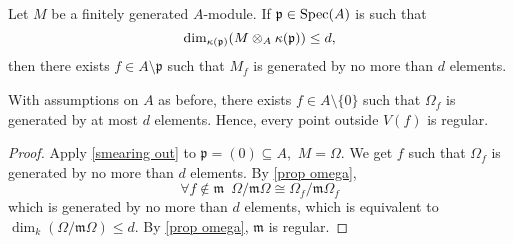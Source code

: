 \begin{prop}
  \label{smearing out}
  Let \(M\) be a finitely generated \(A\)-module. If \(\mathfrak p \in \text{Spec}(A)\) is such that
  \[\dim_{\kappa(\mathfrak p)}(M \otimes_A \kappa(\mathfrak p)) \leq d,\]
  then there exists \(f \in A \setminus \mathfrak p\) such that \(M_f\) is generated by no more than \(d\) elements.
\end{prop}

\begin{corollary}
  With assumptions on \(A\) as before, there exists \(f \in A \setminus \{0\}\) such that \(\Omega_f\) is generated by at most \(d\) elements. Hence, every point outside \(V(f)\) is regular.
\end{corollary}
\begin{proof}
  Apply \cref{smearing out} to \(\mathfrak p = (0) \subseteq A,\) \(M = \Omega.\) We get \(f\) such that \(\Omega_f\) is generated by no more than \(d\) elements. By \cref{prop omega},
  \[\forall f \notin \mathfrak m \enspace \Omega/{\mathfrak m \Omega} \cong \Omega_f /{\mathfrak m \Omega_f}\]
  which is generated by no more than \(d\) elements, which is equivalent to
  \(\dim_k(\Omega / {\mathfrak m \Omega}) \leq d.\)
  By \cref{prop omega}, \(\mathfrak m\) is regular.
\end{proof}


